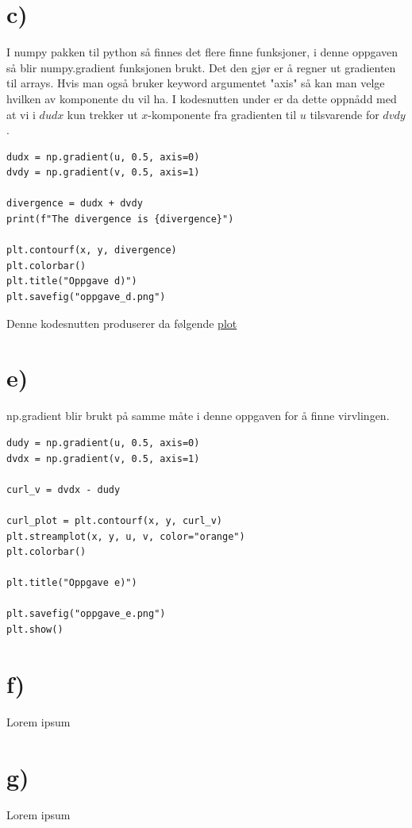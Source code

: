 \documentclass[a4paper,10pt,norsk]{article}
\begin{document}
	\section*{c)}\label{ass:d}
	I numpy pakken til python så finnes det flere finne funksjoner, i denne oppgaven så blir numpy.gradient funksjonen brukt. Det den gjør er å regner ut gradienten til arrays. Hvis man også bruker keyword argumentet "axis" så kan man velge hvilken av komponente du vil ha. I kodesnutten under er da dette oppnådd med at vi i $dudx$ kun trekker ut $x$-komponente fra gradienten til $u$ tilsvarende for  $dvdy$.
	\begin{lstlisting}[caption=Oppgave d]
dudx = np.gradient(u, 0.5, axis=0)
dvdy = np.gradient(v, 0.5, axis=1)

divergence = dudx + dvdy
print(f"The divergence is {divergence}")

plt.contourf(x, y, divergence)
plt.colorbar()
plt.title("Oppgave d)")
plt.savefig("oppgave_d.png")
	\end{lstlisting}
	Denne kodesnutten produserer da følgende \hyperref[fig:d]{plot}
	\section*{e)}\label{ass:e}
	np.gradient blir brukt på samme måte i denne oppgaven for å finne virvlingen.
	\begin{lstlisting}
dudy = np.gradient(u, 0.5, axis=0)
dvdx = np.gradient(v, 0.5, axis=1)

curl_v = dvdx - dudy

curl_plot = plt.contourf(x, y, curl_v)
plt.streamplot(x, y, u, v, color="orange")
plt.colorbar()

plt.title("Oppgave e)")

plt.savefig("oppgave_e.png")
plt.show()
	\end{lstlisting}
	\section*{f)}\label{ass:f}
	Lorem ipsum

	\section*{g)}\label{ass:g}
	Lorem ipsum
\end{document}
